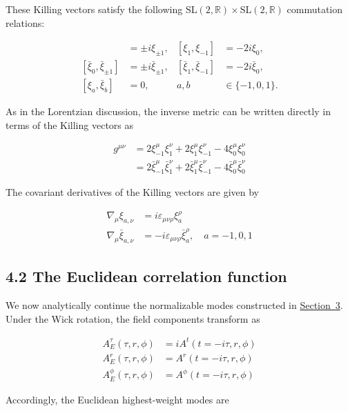 These Killing vectors satisfy the following $\mathrm{SL}(2,\mathbb{R})\times \mathrm{SL}(2,\mathbb{R})$ commutation relations:

\begin{align}
[\xi _{0},\xi _{\pm 1}] & =\pm i\xi _{\pm 1}, & [\xi _{1},\xi _{-1}] & =-2i\xi _{0}, \\
[\bar{\xi}_{0},\bar{\xi}_{\pm 1}] & =\pm i\bar{\xi}_{\pm 1}, & [\bar{\xi}_{1},\bar{\xi}_{-1}] & =-2i\bar{\xi}_{0}, \\
[\xi _{a},\bar{\xi}_{b}] & =0, & a,b & \in \{-1,0,1\}.
\end{align}

As in the Lorentzian discussion, the inverse metric can be written directly in terms of the Killing vectors as

\begin{align}
g^{\mu \nu} & =2\xi _{-1}^{\mu}\xi _{1}^{\nu}+2\xi _{1}^{\mu}\xi _{-1}^{\nu}-4\xi _{0}^{\mu}\xi _{0}^{\nu} \\
 & =2\bar{\xi}_{-1}^{\mu}\bar{\xi}_{1}^{\nu}+2\bar{\xi}_{1}^{\mu}\bar{\xi}_{-1}^{\nu}-4\bar{\xi}_{0}^{\mu}\bar{\xi}_{0}^{\nu}
\end{align}

The covariant derivatives of the Killing vectors are given by

\begin{align}
\nabla _{\mu}\xi _{a,\nu} & =i\varepsilon _{\mu \nu \rho}\xi _{a}^{\rho} \\
\nabla _{\mu}\bar{\xi}_{a,\nu} & =-i\varepsilon _{\mu \nu \rho}\bar{\xi}_{a}^{\rho}, \quad a=-1,0,1
\end{align}

\subsection{4.2 The Euclidean correlation function}\label{subsec:euclidean-correlation-function}

We now analytically continue the normalizable modes constructed in \hyperref[sec:quantization]{Section~3}. Under the Wick rotation, the field components transform as

\begin{align}
A^{\tau}_{E}(\tau,r,\phi) & =iA^{t}(t=-i\tau,r,\phi) \\
A^{r}_{E}(\tau,r,\phi) & =A^{r}(t=-i\tau,r,\phi) \\
A^{\phi}_{E}(\tau,r,\phi) & =A^{\phi}(t=-i\tau,r,\phi)
\end{align}

Accordingly, the Euclidean highest-weight modes are

